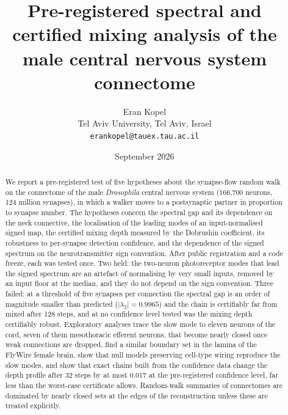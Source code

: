 \documentclass[11pt]{article}
\title{Pre-registered spectral and certified mixing analysis of the male \Dros{} central nervous system connectome}
\author{Eran Kopel\\[2pt] \small Tel Aviv University, Tel Aviv, Israel\\ \small\texttt{erankopel@tauex.tau.ac.il}}
\date{September 2026}
\newcommand{\lamtwo}{\lvert\lambda_2\rvert}
\newcommand{\Dros}{\textit{Drosophila}}
\begin{document}
\maketitle

\begin{abstract}
We report a pre-registered test of five hypotheses about the synapse-flow random walk on the
connectome of the male \Dros{} central nervous system (166{,}700 neurons, 124 million synapses), in
which a walker moves to a postsynaptic partner in proportion to synapse number. The hypotheses
concern the spectral gap and its dependence on the neck connective, the localisation of the leading
modes of an input-normalised signed map, the certified mixing depth measured by the Dobrushin
coefficient, its robustness to per-synapse detection confidence, and the dependence of the signed
spectrum on the neurotransmitter sign convention. After public registration and a code freeze, each
was tested once. Two held: the two-neuron photoreceptor modes that lead the signed spectrum are an
artefact of normalising by very small inputs, removed by an input floor at the median, and they do
not depend on the sign convention. Three failed: at a threshold of five synapses per connection the
spectral gap is an order of magnitude smaller than predicted ($\lamtwo=0.9965$) and the chain is
certifiably far from mixed after 128 steps, and at no confidence level tested was the mixing depth
certifiably robust. Exploratory analyses trace the slow mode to eleven neurons of the cord, seven of
them mesothoracic efferent neurons, that become nearly closed once weak connections are dropped,
find a similar boundary set in the lamina of the FlyWire female brain, show that null models
preserving cell-type wiring reproduce the slow modes, and show that exact chains built from the
confidence data change the depth profile after 32 steps by at most 0.017 at the pre-registered
confidence level, far less than the worst-case certificate allows. Random-walk summaries of
connectomes are dominated by nearly closed sets at the edges of the reconstruction unless these are
treated explicitly.
\end{abstract}












\end{document}
